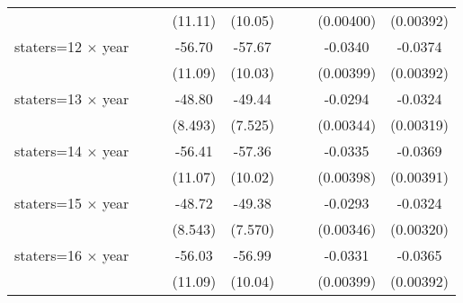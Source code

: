 {\begin{longtable}{l*{8}{c}}
                    &                     &                     &     (11.11)         &     (10.05)         &                     &                     &   (0.00400)         &   (0.00392)         \\
[1em]
staters=12 $\times$ year&                     &                     &      -56.70\sym{***}&      -57.67\sym{***}&                     &                     &     -0.0340\sym{***}&     -0.0374\sym{***}\\
                    &                     &                     &     (11.09)         &     (10.03)         &                     &                     &   (0.00399)         &   (0.00392)         \\
[1em]
staters=13 $\times$ year&                     &                     &      -48.80\sym{***}&      -49.44\sym{***}&                     &                     &     -0.0294\sym{***}&     -0.0324\sym{***}\\
                    &                     &                     &     (8.493)         &     (7.525)         &                     &                     &   (0.00344)         &   (0.00319)         \\
[1em]
staters=14 $\times$ year&                     &                     &      -56.41\sym{***}&      -57.36\sym{***}&                     &                     &     -0.0335\sym{***}&     -0.0369\sym{***}\\
                    &                     &                     &     (11.07)         &     (10.02)         &                     &                     &   (0.00398)         &   (0.00391)         \\
[1em]
staters=15 $\times$ year&                     &                     &      -48.72\sym{***}&      -49.38\sym{***}&                     &                     &     -0.0293\sym{***}&     -0.0324\sym{***}\\
                    &                     &                     &     (8.543)         &     (7.570)         &                     &                     &   (0.00346)         &   (0.00320)         \\
[1em]
staters=16 $\times$ year&                     &                     &      -56.03\sym{***}&      -56.99\sym{***}&                     &                     &     -0.0331\sym{***}&     -0.0365\sym{***}\\
                    &                     &                     &     (11.09)         &     (10.04)         &                     &                     &   (0.00399)         &   (0.00392)         \\

\end{longtable}}
